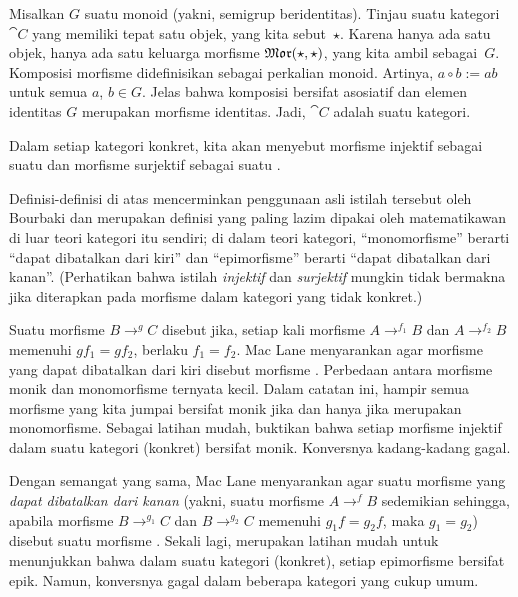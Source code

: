 \begin{exam}\label{C015127} Misalkan $G$ suatu monoid (yakni, semigrup beridentitas).
Tinjau suatu kategori $\cat C$ yang memiliki tepat satu objek, yang kita sebut~$\star$. Karena hanya
ada satu objek, hanya ada satu keluarga morfisme $\operatorname{\mathfrak{Mor}}(\star,\star)$, yang kita
ambil sebagai~$G$. Komposisi morfisme didefinisikan sebagai perkalian monoid.
Artinya, $a \circ b := ab$ untuk semua $a$, $b \in G$. Jelas bahwa komposisi bersifat asosiatif dan
elemen identitas $G$ merupakan morfisme identitas. Jadi, $\cat C$ adalah suatu kategori.
\end{exam}

\begin{defn} Dalam setiap kategori konkret, kita akan menyebut morfisme injektif sebagai suatu
 dan morfisme surjektif sebagai suatu
.
\end{defn}

\begin{cau} Definisi-definisi di atas mencerminkan penggunaan asli istilah tersebut oleh Bourbaki dan merupakan definisi yang
paling lazim dipakai oleh matematikawan di luar teori kategori itu sendiri; di dalam teori kategori,
``monomorfisme'' berarti ``dapat dibatalkan dari kiri'' dan ``epimorfisme'' berarti ``dapat
dibatalkan dari kanan''. (Perhatikan bahwa istilah \emph{injektif} dan \emph{surjektif} mungkin tidak
bermakna jika diterapkan pada morfisme dalam kategori yang tidak konkret.)

Suatu morfisme $B \to^g C$ disebut
 jika, setiap kali morfisme $A \to^{f_1} B$ dan $A \to^{f_2} B$ memenuhi
$gf_1 = gf_2$, berlaku $f_1 = f_2$. Mac Lane menyarankan agar morfisme yang dapat dibatalkan dari kiri disebut
morfisme . Perbedaan antara morfisme monik dan monomorfisme ternyata
kecil. Dalam catatan ini, hampir semua morfisme yang kita jumpai bersifat monik jika dan
hanya jika merupakan monomorfisme. Sebagai latihan mudah, buktikan bahwa setiap morfisme injektif
dalam suatu kategori (konkret) bersifat monik. Konversnya kadang-kadang gagal.

Dengan semangat yang sama, Mac Lane menyarankan agar suatu morfisme yang
\emph{dapat dibatalkan dari kanan} (yakni, suatu morfisme $A \to^f B$ sedemikian sehingga, apabila
morfisme $B \to^{g_1} C$ dan $B \to^{g_2} C$ memenuhi $g_1f = g_2f$, maka $g_1 = g_2$) disebut suatu
morfisme . Sekali lagi, merupakan latihan mudah untuk menunjukkan bahwa dalam suatu kategori (konkret),
setiap epimorfisme bersifat epik. Namun, konversnya gagal dalam beberapa kategori yang cukup umum.
\end{cau}

